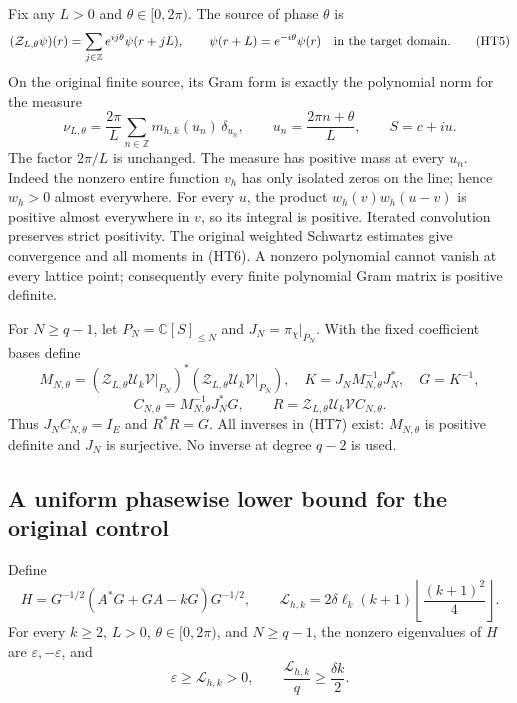 Fix any $L>0$ and $\theta\in[0,2\pi)$.  The source of phase $\theta$ is
\[
 (\mathcal Z_{L,\theta}\psi)(r)=
 \sum_{j\in\mathbb Z}e^{ij\theta}\psi(r+jL),\qquad
 \psi(r+L)=e^{-i\theta}\psi(r)
 \quad\hbox{in the target domain}.
 \tag{HT5}
\]
On the original finite source, its Gram form is exactly the polynomial
norm for the measure
\[
 \nu_{L,\theta}=
 \frac{2\pi}{L}\sum_{n\in\mathbb Z}m_{h,k}(u_n)\,\delta_{u_n},
 \qquad u_n=\frac{2\pi n+\theta}{L},\qquad S=c+iu.
 \tag{HT6}
\]
The factor $2\pi/L$ is unchanged.  The measure has positive mass at every
$u_n$.  Indeed the nonzero entire function $v_h$ has only isolated zeros
on the line; hence $w_h>0$ almost everywhere.  For every $u$, the product
$w_h(v)w_h(u-v)$ is positive almost everywhere in $v$, so its integral is
positive.  Iterated convolution preserves strict positivity.  The
original weighted Schwartz estimates give convergence and all moments
in (HT6).  A nonzero polynomial cannot vanish at every lattice point;
consequently every finite polynomial Gram matrix is positive definite.

For $N\geq q-1$, let $P_N=\mathbb{C}[S]_{\leq N}$ and
$J_N=\pi_\chi|_{P_N}$.  With the fixed coefficient bases define
\[
 M_{N,\theta}=(\mathcal Z_{L,\theta}\mathcal U_k\mathcal V|_{P_N})^*
 (\mathcal Z_{L,\theta}\mathcal U_k\mathcal V|_{P_N}),\quad
 K=J_NM_{N,\theta}^{-1}J_N^*,\quad G=K^{-1},
\]
\[
 C_{N,\theta}=M_{N,\theta}^{-1}J_N^*G,\qquad
 R=\mathcal Z_{L,\theta}\mathcal U_k\mathcal V C_{N,\theta}.
 \tag{HT7}
\]
Thus $J_NC_{N,\theta}=I_E$ and $R^*R=G$.  All inverses in (HT7)
exist: $M_{N,\theta}$ is positive definite and $J_N$ is surjective.
No inverse at degree $q-2$ is used.

\subsection{A uniform phasewise lower bound for the original control}

Define
\[
 H=G^{-1/2}(A^*G+GA-kG)G^{-1/2},\qquad
 \mathcal L_{h,k}=2\delta\ell_k(k+1)
 \left\lfloor\frac{(k+1)^2}{4}\right\rfloor.
 \tag{HT8}
\]
For every $k\geq2$, $L>0$, $\theta\in[0,2\pi)$, and $N\geq q-1$,
the nonzero eigenvalues of $H$ are $\varepsilon,-\varepsilon$, and
\[
 \boxed{\varepsilon\geq\mathcal L_{h,k}>0,
 \qquad \frac{\mathcal L_{h,k}}q\geq\frac{\delta k}{2}.}
 \tag{HT9}
\]

